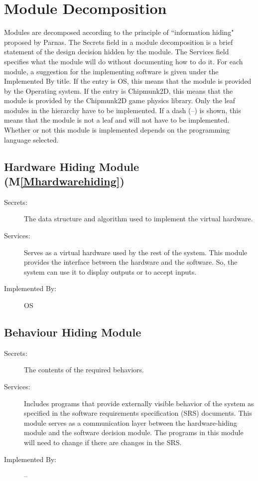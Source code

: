 \documentclass[12pt]{article}
\begin{document}
\section{Module Decomposition}
\label{Sec:MD}
Modules are decomposed according to the principle of ``information hiding" proposed by Parnas. The Secrets field in a module decomposition is a brief statement of the design decision hidden by the module. The Services field specifies what the module will do without documenting how to do it. For each module, a suggestion for the implementing software is given under the Implemented By title. If the entry is OS, this means that the module is provided by the Operating system. If the entry is Chipmunk2D, this means that the module is provided by the Chipmunk2D game physics library. Only the leaf modules in the hierarchy have to be implemented. If a dash (--) is shown, this means that the module is not a leaf and will not have to be implemented. Whether or not this module is implemented depends on the programming language selected.
\subsection{Hardware Hiding Module (M\ref{Mhardwarehiding})}
\label{Sec:HHM()}
\begin{description}
\item[Secrets:]The data structure and algorithm used to implement the virtual hardware.
\item[Services:]Serves as a virtual hardware used by the rest of the system. This module provides the interface between the hardware and the software. So, the system can use it to display outputs or to accept inputs.
\item[Implemented By:]OS
\end{description}
\subsection{Behaviour Hiding Module}
\label{Sec:BHM}
\begin{description}
\item[Secrets:]The contents of the required behaviors.
\item[Services:]Includes programs that provide externally visible behavior of the system as specified in the software requirements specification (SRS) documents. This module serves as a communication layer between the hardware-hiding module and the software decision module. The programs in this module will need to change if there are changes in the SRS.
\item[Implemented By:]--
\end{description}
\end{document}
